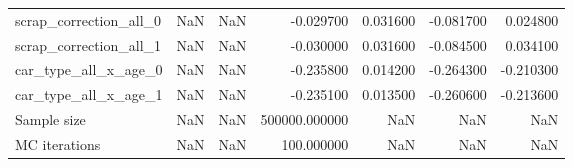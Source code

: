 \begin{tabular}{lrlrrrr}
scrap_correction_all_0 & NaN & NaN & -0.029700 & 0.031600 & -0.081700 & 0.024800 \\
scrap_correction_all_1 & NaN & NaN & -0.030000 & 0.031600 & -0.084500 & 0.034100 \\
car_type_all_x_age_0 & NaN & NaN & -0.235800 & 0.014200 & -0.264300 & -0.210300 \\
car_type_all_x_age_1 & NaN & NaN & -0.235100 & 0.013500 & -0.260600 & -0.213600 \\
Sample size & NaN & NaN & 500000.000000 & NaN & NaN & NaN \\
MC iterations & NaN & NaN & 100.000000 & NaN & NaN & NaN \\
\bottomrule
\end{tabular}
